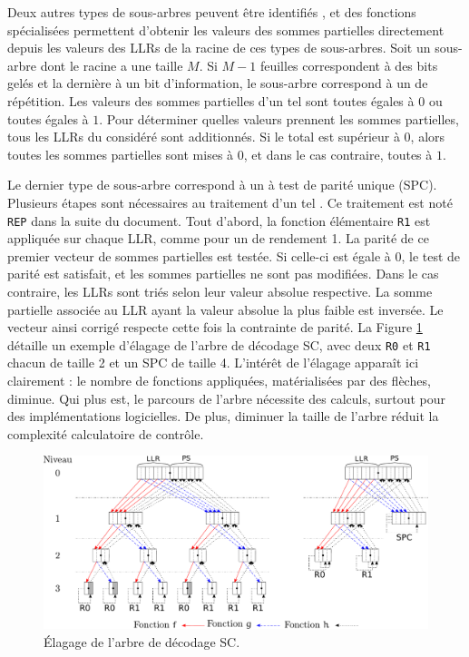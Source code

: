 Deux autres types de sous-arbres peuvent être identifiés \cite{sarkis_fast_2014}, et des fonctions spécialisées permettent d'obtenir les valeurs des sommes partielles directement depuis les valeurs des LLRs de la racine de ces types de sous-arbres. Soit un sous-arbre dont le \noeud racine a une taille $M$. Si $M-1$ feuilles correspondent à des bits gelés et la dernière à un bit d'information, le sous-arbre correspond à un \noeud de répétition. Les valeurs des sommes partielles d'un tel \noeud sont toutes égales à $0$ ou toutes égales à $1$. Pour déterminer quelles valeurs prennent les sommes partielles, tous les LLRs du \noeud considéré sont additionnés. Si le total est supérieur à 0, alors toutes les sommes partielles sont mises à $0$, et dans le cas contraire, toutes à $1$.

Le dernier type de sous-arbre correspond à un \noeud à test de parité unique (SPC). Plusieurs étapes sont nécessaires au traitement d'un tel \noeud. Ce traitement est noté \texttt{REP} dans la suite du document. Tout d'abord, la fonction élémentaire \texttt{R1} est appliquée sur chaque LLR, comme pour un \noeud de rendement 1. La parité de ce premier vecteur de sommes partielles est testée. Si celle-ci est égale à 0, le test de parité est satisfait, et les sommes partielles ne sont pas modifiées. Dans le cas contraire, les LLRs sont triés selon leur valeur absolue respective. La somme partielle associée au LLR ayant la valeur absolue la plus faible est inversée. Le vecteur ainsi corrigé respecte cette fois la contrainte de parité. La Figure \ref{fig:sc_pruned} détaille un exemple d'élagage de l'arbre de décodage SC, avec deux \noeuds \texttt{R0} et \texttt{R1} chacun de taille 2 et un \noeud SPC de taille 4. L'intérêt de l'élagage apparaît ici clairement : le nombre de fonctions appliquées, matérialisées par des flèches, diminue. Qui plus est, le parcours de l'arbre nécessite des calculs, surtout pour des implémentations logicielles. De plus, diminuer la taille de l'arbre réduit la complexité calculatoire de contrôle.

\begin{figure}[h]
  \centering
  \includegraphics[width=\textwidth]{main/ch1_fig/sc_tree_pruned.pdf}
  \caption{\'Elagage de l'arbre de décodage SC.}
  \label{fig:sc_pruned}
\end{figure}

